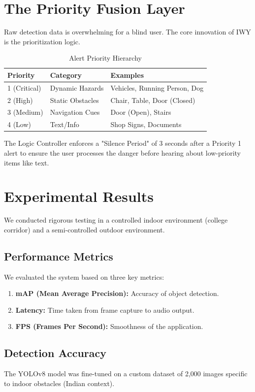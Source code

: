 \documentclass[11pt, a4paper, twocolumn]{article}
\begin{document}
\section{The Priority Fusion Layer}
Raw detection data is overwhelming for a blind user. The core innovation of IWY is the prioritization logic.

\begin{table}[h]
\centering
\caption{Alert Priority Hierarchy}
\begin{tabularx}{\columnwidth}{|l|l|X|}
\hline
\textbf{Priority} & \textbf{Category} & \textbf{Examples} \\ \hline
1 (Critical) & Dynamic Hazards & Vehicles, Running Person, Dog \\ \hline
2 (High) & Static Obstacles & Chair, Table, Door (Closed) \\ \hline
3 (Medium) & Navigation Cues & Door (Open), Stairs \\ \hline
4 (Low) & Text/Info & Shop Signs, Documents \\ \hline
\end{tabularx}
\label{tab:priority}
\end{table}

The Logic Controller enforces a "Silence Period" of 3 seconds after a Priority 1 alert to ensure the user processes the danger before hearing about low-priority items like text.

\section{Experimental Results}
We conducted rigorous testing in a controlled indoor environment (college corridor) and a semi-controlled outdoor environment.

\subsection{Performance Metrics}
We evaluated the system based on three key metrics:
\begin{enumerate}
    \item \textbf{mAP (Mean Average Precision):} Accuracy of object detection.
    \item \textbf{Latency:} Time taken from frame capture to audio output.
    \item \textbf{FPS (Frames Per Second):} Smoothness of the application.
\end{enumerate}

\subsection{Detection Accuracy}
The YOLOv8 model was fine-tuned on a custom dataset of 2,000 images specific to indoor obstacles (Indian context).
\end{document}
